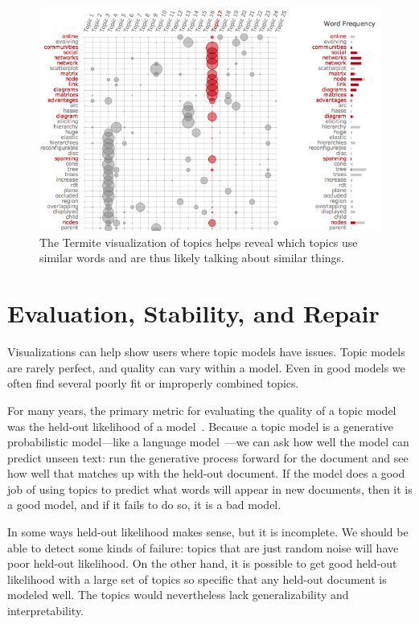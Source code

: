 \begin{figure}
  \includegraphics[width=.9\linewidth]{figures/viz_termite}
  \caption{The Termite visualization of topics helps reveal which
    topics use similar words and are thus likely talking about similar
    things.}
  \label{fig:termite}
\end{figure}

\section{Evaluation, Stability, and Repair}
\label{sec:coherence}

Visualizations can help show users where topic models have issues.
Topic models are rarely perfect, and quality can vary within a
model. Even in good models we often find several poorly fit or
improperly combined topics. 

For many years, the primary metric for evaluating the quality of a
topic model was the held-out likelihood of a model~\citep{wallach-09a}.
Because a topic model is a generative probabilistic model---like a
language model~\citep{chen-98}---we can ask how well the model can
predict unseen text: run the generative process forward for the
document and see how well that matches up with the held-out document.
If the model does a good job of using topics to predict what words
will appear in new documents, then it is a good model, and if it fails
to do so, it is a bad model.

In some ways held-out likelihood makes sense, but it is incomplete.
We should be able to detect some kinds of failure: topics that are just random noise will have poor held-out likelihood.
On the other hand, it is possible to get good held-out likelihood with a large set of topics so specific that any held-out document is modeled well.
The topics would nevertheless lack generalizability and interpretability.

